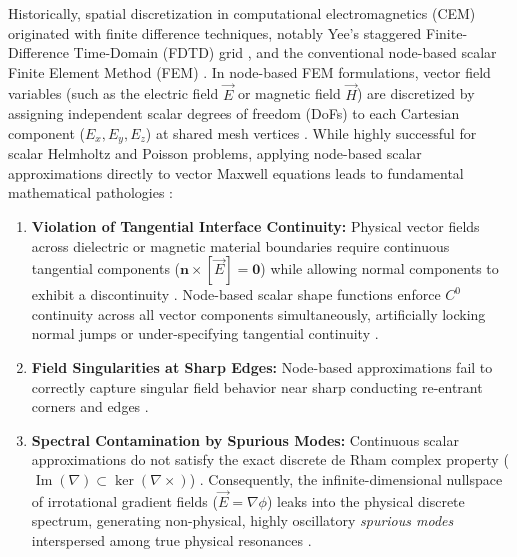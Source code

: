 \documentclass[preprint,12pt]{elsarticle}
\begin{document}
Historically, spatial discretization in computational electromagnetics (CEM) originated with finite difference techniques, notably Yee's staggered Finite-Difference Time-Domain (FDTD) grid \cite{yee1966numerical}, and the conventional node-based scalar Finite Element Method (FEM) \cite{jin2014finite}. In node-based FEM formulations, vector field variables (such as the electric field $\vec{E}$ or magnetic field $\vec{H}$) are discretized by assigning independent scalar degrees of freedom (DoFs) to each Cartesian component ($E_x, E_y, E_z$) at shared mesh vertices \cite{jin2014finite, bossavit1998computational}. While highly successful for scalar Helmholtz and Poisson problems, applying node-based scalar approximations directly to vector Maxwell equations leads to fundamental mathematical pathologies \cite{bossavit1998computational, boffi1999computational}:
\begin{enumerate}
    \item \textbf{Violation of Tangential Interface Continuity:} Physical vector fields across dielectric or magnetic material boundaries require continuous tangential components ($\mathbf{n} \times [\vec{E}] = \mathbf{0}$) while allowing normal components to exhibit a discontinuity \cite{jin2014finite, monk2003finite}. Node-based scalar shape functions enforce $C^0$ continuity across all vector components simultaneously, artificially locking normal jumps or under-specifying tangential continuity \cite{bossavit1998computational}.
    \item \textbf{Field Singularities at Sharp Edges:} Node-based approximations fail to correctly capture singular field behavior near sharp conducting re-entrant corners and edges \cite{monk2003finite, boffi1999computational}.
    \item \textbf{Spectral Contamination by Spurious Modes:} Continuous scalar approximations do not satisfy the exact discrete de Rham complex property ($\operatorname{Im}(\nabla) \subset \ker(\nabla \times)$) \cite{monk2003finite, bossavit1998computational}. Consequently, the infinite-dimensional nullspace of irrotational gradient fields ($\vec{E} = \nabla \phi$) leaks into the physical discrete spectrum, generating non-physical, highly oscillatory \emph{spurious modes} interspersed among true physical resonances \cite{bossavit1990spurious, boffi1999computational, boffi2013mixed}.
\end{enumerate}
\end{document}
